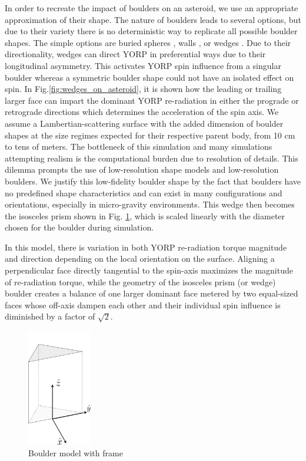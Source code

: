In order to recreate the impact of boulders on an asteroid, we use an appropriate approximation of their shape. The nature of boulders leads to several options, but due to their variety there is no deterministic way to replicate all possible boulder shapes. The simple options are buried spheres \citep{Golubov2014}, walls \citep{Golubov2017}, or wedges \citep{Bottke2006}. Due to their directionality, wedges can direct YORP in preferential ways due to their longitudinal asymmetry. This activates YORP spin influence from a singular boulder whereas a symmetric boulder shape could not have an isolated effect on spin. In Fig.\ref{fig:wedges_on_asteroid}, it is shown how the leading or trailing larger face can impart the dominant YORP re-radiation in either the prograde or retrograde directions which determines the acceleration of the spin axis. 
We assume a Lambertian-scattering surface with the added dimension of boulder shapes at the size regimes expected for their respective parent body, from 10 cm to tens of meters. The bottleneck of this simulation and many simulations attempting realism is the computational burden due to resolution of details. This dilemma prompts the use of low-resolution shape models and low-resolution boulders. We justify this low-fidelity boulder shape by the fact that boulders have no predefined shape characteristics and can exist in many configurations and orientations, especially in micro-gravity environments. This wedge then becomes the isosceles prism shown in Fig. \ref{fig:prism}, which is scaled linearly with the diameter chosen for the boulder during simulation.


In this model, there is variation in both YORP re-radiation torque magnitude and direction depending on the local orientation on the surface. Aligning a perpendicular face directly tangential to the spin-axis maximizes the magnitude of re-radiation torque, while the geometry of the isosceles prism (or wedge) boulder creates a balance of one larger dominant face metered by two equal-sized faces whose off-axis dampen each other and their individual spin influence is diminished by a factor of $\sqrt{2}$.

\begin{figure}[H]
    \centering
    \includegraphics[width=0.25\textwidth,height=0.4\textwidth]{fig/prism.png}
    \caption{Boulder model with frame}
    \label{fig:prism}
\end{figure}

